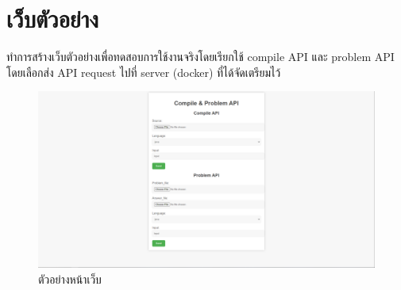 \section{เว็บตัวอย่าง}
ทำการสร้างเว็บตัวอย่างเพื่อทดสอบการใช้งานจริงโดยเรียกใช้ compile API และ problem API โดยเลือกส่ง API request ไปที่ server (docker) ที่ได้จัดเตรียมไว้
    \begin{figure}[H]
        \centering
            \centering
            \includegraphics[width=5in]{latex/figures/web.png}
        \caption{ตัวอย่างหน้าเว็บ}
    \end{figure}

